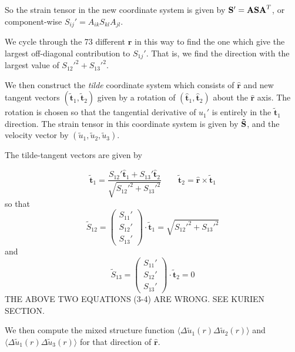 \documentclass[12pt]{article}
\begin{document}
So the strain tensor in the new coordinate system is  given by 
${\bf S}' = {\bf A S A}^{T}$, or component-wise
$S_{ij}' = A_{ik} S_{kl} A_{jl}$.

We cycle through the 73 different $\bm{{\hat r}}$ in this way to find the one 
which give the largest off-diagonal
contribution to $S_{1j}'$.  That is, we find the 
direction with the largest value of $S_{12}'^2 + S_{13}'^2$.  

We then construct the {\em tilde} coordinate system which consists
of $\bm{{\hat r}}$ and new tangent vectors $( \bm{{\tilde t}}_1, 
\bm{{\tilde t}}_2 )$ given by a rotation of $( \bm{{\hat t}}_1, \bm{{\hat t}}_2 )$
about the $\bm{{\hat r}}$ axis.  The rotation is chosen so that the 
tangential derivative of $u_1'$ is entirely in the $\bm{{\tilde t}}_1$
direction.  The strain tensor in this coordinate system
is given by ${\bf \tilde S}$, and the velocity vector by 
$( \tilde u_1, \tilde u_2, \tilde u_3)$. 

The tilde-tangent vectors are given by 

\begin{equation}
\bm{{\tilde t}}_1 = \frac{S_{12}'  \bm{{\hat t}}_1 +  S_{13}'  \bm{{\hat t}}_2 }
                         {\sqrt{ S_{12}'^2 +  S_{13}'^2 } } 
\qquad
\bm{{\tilde t}}_2 = \bm{{\hat r}} \times \bm{{\tilde t}}_1
\end{equation}
so that
\begin{equation}
\tilde S_{12} = 
\begin{pmatrix}  S_{11}' \\
                 S_{12}' \\
                 S_{13}' 
\end{pmatrix}
\cdot \bm{{\tilde t}}_1 = 
 \sqrt{ S_{12}'^2 + S_{13}'^2 }
\end{equation}
and 
\begin{equation}
\tilde S_{13} = 
\begin{pmatrix}  S_{11}' \\
                 S_{12}' \\
                 S_{13}' 
\end{pmatrix}
\cdot \bm{{\tilde t}}_2 =  0
\end{equation}
THE ABOVE TWO EQUATIONS (3-4) ARE WRONG. SEE KURIEN SECTION.

We then compute the mixed structure function $\langle \Delta \tilde u_1 (r) 
\Delta \tilde u_2 (r)\rangle$ and 
$\langle \Delta \tilde u_1 (r) \Delta \tilde u_3 (r)\rangle$ for that direction of $\bm{{\hat r}}$.
\end{document}
